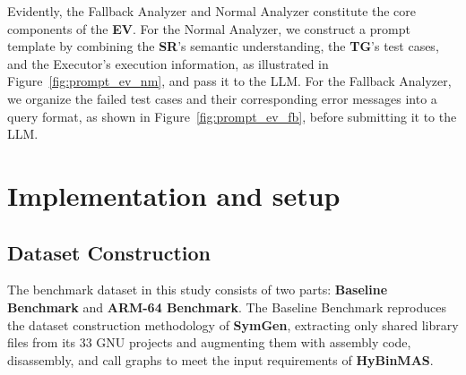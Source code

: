 \documentclass[acmsmall,screen,review,anonymous]{acmart} %
\begin{document}
Evidently, the Fallback Analyzer and Normal Analyzer constitute the core components of the \textbf{EV}. For the Normal Analyzer, we construct a prompt template by combining the \textbf{SR}’s semantic understanding, the \textbf{TG}’s test cases, and the Executor’s execution information, as illustrated in Figure~\ref{fig:prompt_ev_nm}, and pass it to the LLM. For the Fallback Analyzer, we organize the failed test cases and their corresponding error messages into a query format, as shown in Figure~\ref{fig:prompt_ev_fb}, before submitting it to the LLM.




\section{Implementation and setup}


\subsection{Dataset Construction}

The benchmark dataset in this study consists of two parts: \textbf{Baseline Benchmark} and \textbf{ARM-64 Benchmark}. The Baseline Benchmark reproduces the dataset construction methodology of \textbf{SymGen}, extracting only shared library files from its 33 GNU projects and augmenting them with assembly code, disassembly, and call graphs to meet the input requirements of \textbf{HyBinMAS}.
\end{document}
